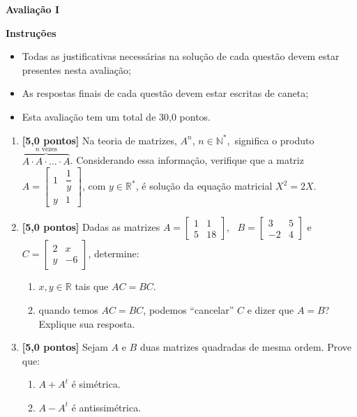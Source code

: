 \documentclass[12pt,a4paper]{article}
\begin{document}
\begin{center}
 \textbf{Avaliação I}
\end{center}

\textbf{Instruções}
\begin{itemize}
 \item Todas as justificativas necessárias na solução de cada questão devem estar presentes nesta avaliação;
 \item As respostas finais de cada questão devem estar escritas de caneta;
 \item Esta avaliação tem um total de 30,0 pontos.
\end{itemize}

\begin{enumerate}
  \item \textbf{[5,0 pontos]} Na teoria de matrizes, $A^{n}$, $n\in\mathbb{N}^*,$ significa o produto
    $\overbrace{A\cdot A\cdot\ldots\cdot A}^{n\textrm{ vezes}}$. Considerando
    essa informação, verifique que a matriz 
    $A=\begin{bmatrix}
      1 & \dfrac{1}{y}\\
      y & 1
    \end{bmatrix}$, com $y\in\mathbb{R}^{*}$, é solução da equação matricial $X^{2}=2X$.

  \item \textbf{[5,0 pontos]} Dadas as matrizes
    $A=
      \begin{bmatrix}
        1 & 1 \\
        5 & 18
      \end{bmatrix},
      \ \ \ 
    B=\begin{bmatrix}
      3 & 5 \\
      -2 & 4
    \end{bmatrix}$ e 
    $C=\begin{bmatrix}
      2 & x \\
      y & -6
    \end{bmatrix}$, determine:

    \begin{enumerate}
      \item $x , y \in\mathbb{R}$ tais que $AC=BC$.
     \item quando temos $AC=BC$, podemos ``cancelar'' $C$ e dizer que $A=B$? Explique sua resposta.
    \end{enumerate}

  \item \textbf{[5,0 pontos]} Sejam $A$ e $B$ duas matrizes quadradas de mesma ordem. Prove que:
    \begin{enumerate}
      \item $A + A^t$ é simétrica.
      \item $A - A^t$ é antissimétrica.
    \end{enumerate}


\end{enumerate}
\end{document}
